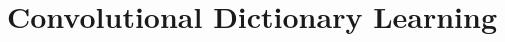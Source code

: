 \documentclass[main_dicodile]{subfiles}
\begin{document}
%


\section{Convolutional Dictionary Learning}
\label{sec:cdl}

\end{document}
